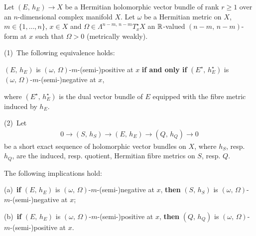 \documentclass[12pt]{article}
\begin{document}
\begin{Prop}\label{Prop:m-pos_properties} Let $(E,\,h_E)\longrightarrow X$ be a Hermitian holomorphic vector bundle of rank $r\geq 1$ over an $n$-dimensional complex manifold $X$. Let $\omega$ be a Hermitian metric on $X$, $m\in\{1,\dots , n\}$, $x\in X$ and $\Omega\in\Lambda^{n-m,\,n-m}T^\star_x X$ an $\mathbb{R}$-valued $(n-m,\,n-m)$-form at $x$ such that $\Omega> 0$ (metrically weakly).

\vspace{1ex}

 (1)\, The following equivalence holds:

\vspace{1ex}

\hspace{-4ex} $(E,\,h_E)$ is  $(\omega,\,\Omega)$-$m$-(semi-)positive at $x$ {\bf if and only if} $(E^\star,\,h_E^\star)$ is  $(\omega,\,\Omega)$-$m$-(semi-)negative at $x$,

\vspace{1ex}

\noindent where $(E^\star,\,h_E^\star)$ is the dual vector bundle of $E$ equipped with the fibre metric induced by $h_E$.

\vspace{1ex}

 (2)\, Let \begin{eqnarray*}0\longrightarrow (S,\,h_S) \longrightarrow (E,\,h_E) \longrightarrow (Q,\,h_Q)\longrightarrow 0\end{eqnarray*} be a short exact sequence of holomorphic vector bundles on $X$, where $h_S$, resp. $h_Q$, are the induced, resp. quotient, Hermitian fibre metrics on $S$, resp. $Q$.

  The following implications hold:

\vspace{1ex}

(a)\, {\bf if} $(E,\,h_E)$ is  $(\omega,\,\Omega)$-$m$-(semi-)negative at $x$, {\bf then} $(S,\,h_S)$ is $(\omega,\,\Omega)$-$m$-(semi-)negative at $x$;

\vspace{1ex}

(b)\, {\bf if} $(E,\,h_E)$ is  $(\omega,\,\Omega)$-$m$-(semi-)positive at $x$, {\bf then} $(Q,\,h_Q)$ is $(\omega,\,\Omega)$-$m$-(semi-)positive at $x$. 


\end{Prop}  
\end{document}

